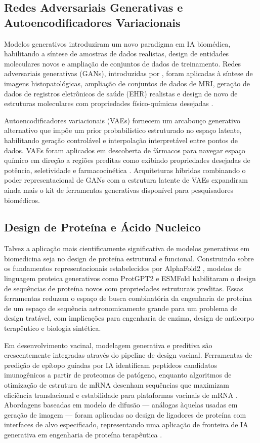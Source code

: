 \subsection{Redes Adversariais Generativas e Autoencodificadores Variacionais}

Modelos generativos introduziram um novo paradigma em IA biomédica, habilitando a síntese de amostras de dados realistas, design de entidades moleculares novos e ampliação de conjuntos de dados de treinamento. Redes adversariais generativas (GANs), introduzidas por \textcite{goodfellow2014}, foram aplicadas à síntese de imagens histopatológicas, ampliação de conjuntos de dados de MRI, geração de dados de registros eletrônicos de saúde (EHR) realistas e design de novo de estruturas moleculares com propriedades físico-químicas desejadas \parencite{kadurin2017, baowaly2019}.

Autoencodificadores variacionais (VAEs) fornecem um arcabouço generativo alternativo que impõe um prior probabilístico estruturado no espaço latente, habilitando geração controlável e interpolação interpretável entre pontos de dados. VAEs foram aplicados em descoberta de fármacos para navegar espaço químico em direção a regiões preditas como exibindo propriedades desejadas de potência, seletividade e farmacocinética \parencite{gomez2018}. Arquiteturas híbridas combinando o poder representacional de GANs com a estrutura latente de VAEs expandiram ainda mais o kit de ferramentas generativas disponível para pesquisadores biomédicos.

\subsection{Design de Proteína e Ácido Nucleico}

Talvez a aplicação mais cientificamente significativa de modelos generativos em biomedicina seja no design de proteína estrutural e funcional. Construindo sobre os fundamentos representacionais estabelecidos por AlphaFold2 \parencite{jumper2021}, modelos de linguagem proteica generativos como ProtGPT2 \parencite{ferruz2022} e ESMFold \parencite{lin2023} habilitaram o design de sequências de proteína novos com propriedades estruturais preditas. Essas ferramentas reduzem o espaço de busca combinatória da engenharia de proteína de um espaço de sequência astronomicamente grande para um problema de design tratável, com implicações para engenharia de enzima, design de anticorpo terapêutico e biologia sintética.

Em desenvolvimento vacinal, modelagem generativa e preditiva são crescentemente integradas através do pipeline de design vacinal. Ferramentas de predição de epítopo guiadas por IA identificam peptídeos candidatos imunogênicos a partir de proteomas de patógeno, enquanto algoritmos de otimização de estrutura de mRNA desenham sequências que maximizam eficiência translacional e estabilidade para plataformas vacinais de mRNA \parencite{imani2025}. Abordagens baseadas em modelo de difusão --- análogas àquelas usadas em geração de imagem --- foram aplicadas ao design de ligadores de proteína com interfaces de alvo especificado, representando uma aplicação de fronteira de IA generativa em engenharia de proteína terapêutica \parencite{watson2023}.

